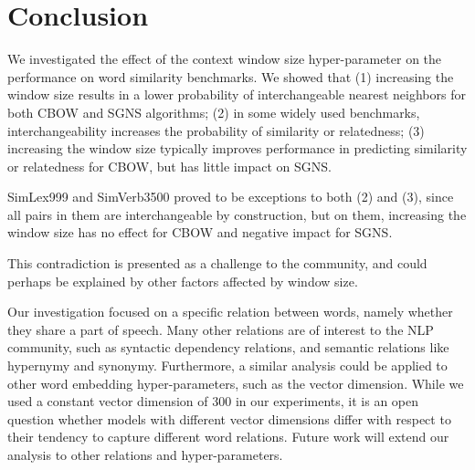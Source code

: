 \documentclass[11pt,a4paper]{article}
\begin{document}
\section{Conclusion}\label{sec:conclusion}

    We investigated the effect of the context window size hyper-parameter
    on the performance on word similarity benchmarks.
    We showed that
    (1) increasing the window size results in a lower probability of interchangeable
    nearest neighbors for both CBOW and SGNS algorithms;
    (2) in some widely used benchmarks,
    interchangeability increases the probability of similarity or relatedness;
    (3) increasing the window size typically improves performance
    in predicting similarity or relatedness for CBOW,
    but has little impact on SGNS.
    
    SimLex999 and SimVerb3500 proved to be exceptions to both (2) and (3),
    since all pairs in them are interchangeable by construction,
    but on them, increasing the window size has no effect for CBOW
    and negative impact for SGNS.
    
    This contradiction is presented as a challenge to the community,
    and could perhaps be explained by other factors affected by window size.
    
    Our investigation focused on a specific relation between words,
    namely whether they share a part of speech.
    Many other relations are of interest to the NLP
    community, such as syntactic dependency relations,
    and semantic relations like hypernymy and synonymy.
    Furthermore, a similar analysis could be applied to other word
    embedding hyper-parameters, such as the vector dimension.
    While we used a constant vector dimension of 300 in our experiments,
    it is an open question whether models with different vector dimensions
    differ with respect to their tendency to capture different word relations.
    Future work will extend our analysis to other relations and hyper-parameters.

    
    
    
\end{document}
